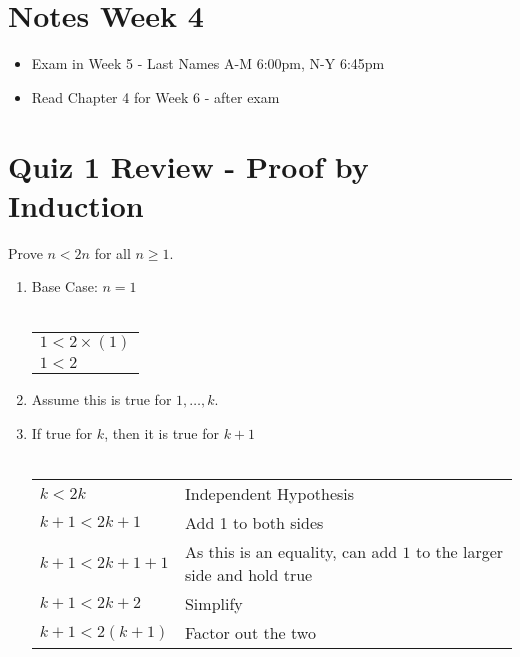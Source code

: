 \documentclass[12pt]{article}
\begin{document}
\section*{Notes Week 4}

\begin{itemize}

    \item Exam in Week 5 - Last Names A-M 6:00pm, N-Y 6:45pm
    
    \item Read Chapter 4 for Week 6 - after exam

\end{itemize}

\section*{Quiz 1 Review - Proof by Induction}

Prove $n < 2n$ for all $n \geq 1$.

\begin{enumerate}

    \item Base Case: $n=1$ \\ \\
    \begin{tabular}{l}
        $1 < 2\times(1)$ \\ 
        $1 < 2$
    \end{tabular}

    \item Assume this is true for $1, \ldots, k$.

    \item If true for $k$, then it is true for $k+1$ \\ \\ 
    \begin{tabular}{l l}
        $k < 2k$ & Independent Hypothesis \\
        $k + 1 < 2k + 1$ & Add 1 to both sides \\
        $k + 1 < 2k + 1 + 1$ & As this is an equality, can add $1$ to the larger side and hold true \\
        $k + 1 < 2k + 2$ & Simplify \\
        $k + 1 < 2(k + 1)$ & Factor out the two \\
    \end{tabular}

\end{enumerate}

\pagebreak
\end{document}
